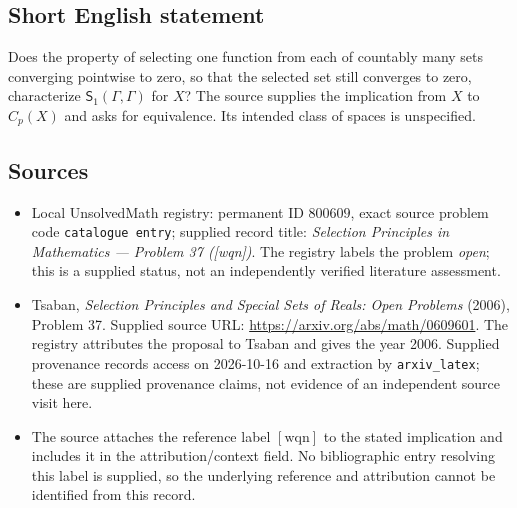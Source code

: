 \documentclass[11pt]{article}
\begin{document}
\subsection{Short English statement}
Does the property of selecting one function from each of countably many sets converging pointwise to zero, so that the selected set still converges to zero, characterize \(\mathsf S_1(\Gamma,\Gamma)\) for \(X\)? The source supplies the implication from \(X\) to \(C_p(X)\) and asks for equivalence. Its intended class of spaces is unspecified.
\subsection{Sources}
\begin{itemize}
\item Local UnsolvedMath registry: permanent ID \(800609\), exact source problem code \texttt{catalogue entry}; supplied record title: \emph{Selection Principles in Mathematics --- Problem 37 ([wqn])}. The registry labels the problem \emph{open}; this is a supplied status, not an independently verified literature assessment.
\item Tsaban, \emph{Selection Principles and Special Sets of Reals: Open Problems} (2006), Problem 37. Supplied source URL: \url{https://arxiv.org/abs/math/0609601}. The registry attributes the proposal to Tsaban and gives the year 2006. Supplied provenance records access on 2026-10-16 and extraction by \texttt{arxiv\_latex}; these are supplied provenance claims, not evidence of an independent source visit here.
\item The source attaches the reference label \([\mathrm{wqn}]\) to the stated implication and includes it in the attribution/context field. No bibliographic entry resolving this label is supplied, so the underlying reference and attribution cannot be identified from this record.
\end{itemize}
\end{document}
